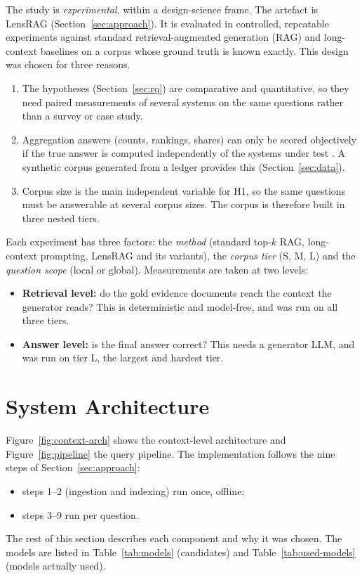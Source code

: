 \documentclass[11pt,letterpaper,oneside]{report}
\begin{document}
The study is \emph{experimental}, within a design-science frame. The artefact
is LensRAG (Section~\ref{sec:approach}). It is evaluated in controlled,
repeatable experiments against standard retrieval-augmented generation (RAG)
and long-context baselines on a corpus whose ground truth is known exactly.
This design was chosen for three reasons.
\begin{enumerate}
  \item The hypotheses (Section~\ref{sec:rq}) are comparative and
  quantitative, so they need paired measurements of several systems on the
  same questions rather than a survey or case study.
  \item Aggregation answers (counts, rankings, shares) can only be scored
  objectively if the true answer is computed independently of the systems
  under test \citep{lu2026corpusqa}. A synthetic corpus generated from a
  ledger provides this (Section~\ref{sec:data}).
  \item Corpus size is the main independent variable for H1, so the same
  questions must be answerable at several corpus sizes. The corpus is
  therefore built in three nested tiers.
\end{enumerate}

Each experiment has three factors: the \emph{method} (standard top-$k$ RAG,
long-context prompting, LensRAG and its variants), the \emph{corpus tier}
(S, M, L) and the \emph{question scope} (local or global). Measurements are
taken at two levels:
\begin{itemize}
  \item \textbf{Retrieval level:} do the gold evidence documents reach the
  context the generator reads? This is deterministic and model-free, and was
  run on all three tiers.
  \item \textbf{Answer level:} is the final answer correct? This needs a
  generator LLM, and was run on tier L, the largest and hardest tier.
\end{itemize}

\section{System Architecture}
\label{sec:architecture}

Figure~\ref{fig:context-arch} shows the context-level architecture and
Figure~\ref{fig:pipeline} the query pipeline. The implementation follows the
nine steps of Section~\ref{sec:approach}:
\begin{itemize}
  \item steps 1--2 (ingestion and indexing) run once, offline;
  \item steps 3--9 run per question.
\end{itemize}
The rest of this section describes each component and why it was chosen. The
models are listed in Table~\ref{tab:models} (candidates) and
Table~\ref{tab:used-models} (models actually used).
\end{document}

